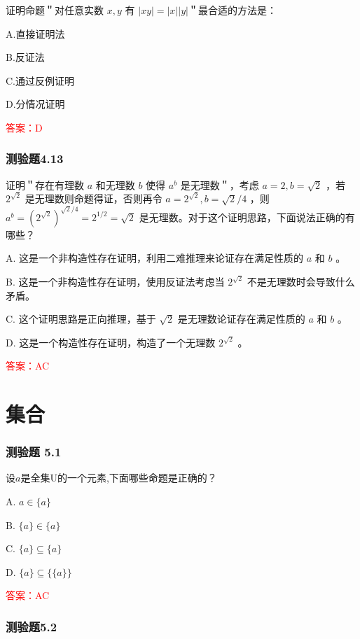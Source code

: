 \documentclass[UTF8, heading=true]{ctexart}
\begin{document}
证明命题＂对任意实数 $x, y$ 有 $|x y|=|x||y|$＂最合适的方法是：

A.直接证明法

B.反证法

C.通过反例证明

D.分情况证明

\textcolor{red}{答案：D}

\subsubsection{测验题4.13}

证明＂存在有理数 $a$ 和无理数 $b$ 使得 $a^b$ 是无理数＂，考虑 $a=2, b=\sqrt{2}$ ，若 $2^{\sqrt{2}}$ 是无理数则命题得证，否则再令 $a=2^{\sqrt{2}}, b=\sqrt{2} / 4$ ，则 $a^b=\left(2^{\sqrt{2}}\right)^{\sqrt{2} / 4}=2^{1 / 2}=\sqrt{2}$ 是无理数。对于这个证明思路，下面说法正确的有哪些？

A. 这是一个非构造性存在证明，利用二难推理来论证存在满足性质的 $a$ 和 $b$ 。

B. 这是一个非构造性存在证明，使用反证法考虑当 $2^{\sqrt{2}}$ 不是无理数时会导致什么矛盾。

C. 这个证明思路是正向推理，基于 $\sqrt{2}$ 是无理数论证存在满足性质的 $a$ 和 $b$ 。

D. 这是一个构造性存在证明，构造了一个无理数 $2^{\sqrt{2}}$ 。

\textcolor{red}{答案：AC}




\clearpage

\section{集合}

\subsubsection{测验题 5.1}
设$a$是全集U的一个元素,下面哪些命题是正确的？

A. $ a \in\{a\}$

B. $\{a\} \in\{a\}$

C. $\{a\} \subseteq\{a\}$

D. $\{a\} \subseteq\{\{a\}\}$

\textcolor{red}{答案：AC}

\subsubsection{测验题5.2}
\end{document}
